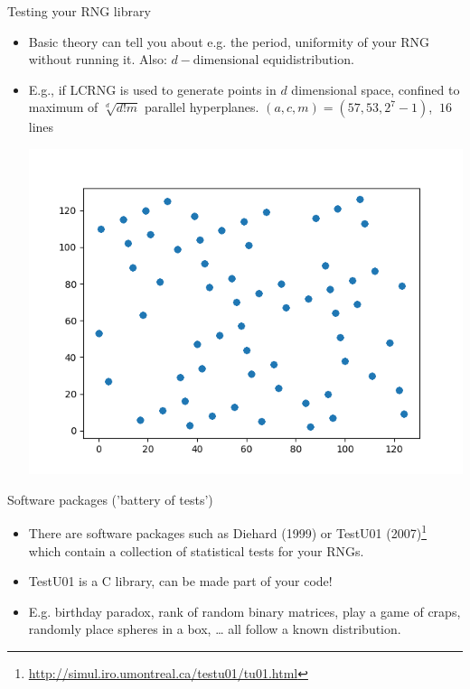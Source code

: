 \documentclass[10pt]{beamer}
\begin{document}
\begin{frame}[label={sec:org19eb28c}]{Testing your RNG library}
\begin{itemize}
\item Basic theory can tell you about e.g. the period, uniformity of your RNG without
running it. Also: \alert{\(d-\text{dimensional}\) equidistribution}.
\item E.g., if LCRNG is used to generate points in \(d\)
dimensional space, confined to maximum of \(\sqrt[d]{d!m}\) parallel hyperplanes.
\((a, c, m) = (57, 53, 2^7 - 1)\), \textrightarrow \(~16\) lines
\begin{center}
\includegraphics[height=0.65\textheight]{./hyperplanes.png}
\end{center}
\end{itemize}
\end{frame}
\begin{frame}[label={sec:org6ed358f}]{Software packages ('battery of tests')}
\begin{itemize}
\item There are software packages such as Diehard (1999) or
\alert{TestU01} (2007)\footnote{\url{http://simul.iro.umontreal.ca/testu01/tu01.html}} which
contain a collection of statistical tests for your RNGs.
\item TestU01 is a C library, can be made part of your code!
\item E.g. \alert{birthday paradox}, \alert{rank of random binary matrices}, \alert{play a game of
craps}, \alert{randomly place spheres in a box}, \ldots{} all follow a known
distribution.
\end{itemize}
\end{frame}
\end{document}
